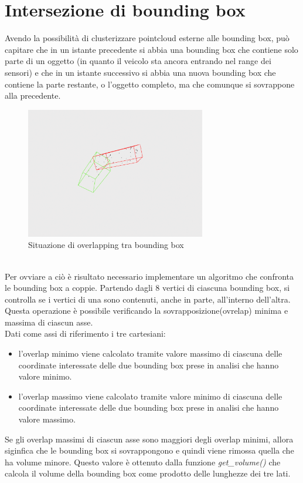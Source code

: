 \documentclass[italian]{report}
\begin{document}
\section{Intersezione di bounding box}
Avendo la possibilità di clusterizzare pointcloud esterne alle bounding box, può capitare che in un istante precedente si abbia una bounding box che contiene solo parte di un oggetto (in quanto il veicolo sta ancora entrando nel range dei sensori) e che in un istante successivo si abbia una nuova bounding box che contiene la parte restante, o l'oggetto completo, ma che comunque si sovrappone alla precedente.\\
\begin{figure}[H]
	\centering
	\includegraphics[width=0.7\textwidth]{Overlapping}
	\footnotesize
	\caption{Situazione di overlapping tra bounding box}
\end{figure}\\
Per ovviare a ciò è risultato necessario implementare un algoritmo che confronta le bounding box a coppie. Partendo dagli 8 vertici di ciascuna bounding box, si controlla se i vertici di una sono contenuti, anche in parte, all'interno dell'altra. Questa operazione è possibile verificando la sovrapposizione(ovrelap) minima e massima di ciascun asse.\\
Dati come assi di riferimento i tre cartesiani:
\begin{itemize}
	\item l'overlap minimo viene calcolato tramite valore massimo di ciascuna delle coordinate interessate delle due bounding box prese in analisi che hanno valore minimo.
	\item l'overlap massimo viene calcolato tramite valore minimo di ciascuna delle coordinate interessate delle due bounding box prese in analisi che hanno valore massimo.
\end{itemize}
Se gli overlap massimi di ciascun asse sono maggiori degli overlap minimi, allora siginfica che le bounding box si sovrappongono e quindi viene rimossa quella che ha volume minore. Questo valore è ottenuto dalla funzione \textit{get\_volume()} che calcola il volume della bounding box come prodotto delle lunghezze dei tre lati.\\
\end{document}
